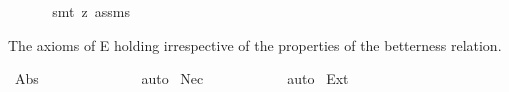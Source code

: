 \begin{isabellebody}
\ \ %
\isanewline
%
\isadelimproof
\ \ %
\endisadelimproof
%
\isatagproof
{}\isamarkupfalse%
\ {\isacharparenleft}{\kern0pt}smt\ {\isacharparenleft}{\kern0pt}z{}{\isacharparenright}{\kern0pt}\ assms{\isacharparenright}{\kern0pt}%
\endisatagproof
{\isafoldproof}%
%
\isadelimproof
%
\endisadelimproof
%
\begin{isamarkuptext}%
The axioms of E holding irrespective of the properties of the betterness relation.%
\end{isamarkuptext}\isamarkuptrue%
\isamarkupfalse%
\ Abs{\isacharprime}{\kern0pt}{\isacharcolon}{\kern0pt}\ {\isachardoublequoteopen}{\isasymlfloor}{\isasymcirc}{\isacharless}{\kern0pt}{\isasympsi}{\isacharbar}{\kern0pt}{\isasymphi}{\isachargreater}{\kern0pt}\ \isactrlbold {\isasymrightarrow}\ {\isasymbox}{\isasymcirc}{\isacharless}{\kern0pt}{\isasympsi}{\isacharbar}{\kern0pt}{\isasymphi}{\isachargreater}{\kern0pt}{\isasymrfloor}{\isachardoublequoteclose}\ \ \ \isanewline
\ \ %
\ \isanewline
%
\isadelimproof
\ \ %
\endisadelimproof
%
\isatagproof
{}\isamarkupfalse%
\ auto%
\endisatagproof
{\isafoldproof}%
%
\isadelimproof
\isanewline
%
\endisadelimproof
{}\isamarkupfalse%
\ Nec{\isacharprime}{\kern0pt}{\isacharcolon}{\kern0pt}\ {\isachardoublequoteopen}{\isasymlfloor}{\isasymbox}{\isasympsi}\ \isactrlbold {\isasymrightarrow}\ {\isasymcirc}{\isacharless}{\kern0pt}{\isasympsi}{\isacharbar}{\kern0pt}{\isasymphi}{\isachargreater}{\kern0pt}{\isasymrfloor}{\isachardoublequoteclose}\ \ \isanewline
\ \ %
\isanewline
%
\isadelimproof
\ \ %
\endisadelimproof
%
\isatagproof
{}\isamarkupfalse%
\ auto%
\endisatagproof
{\isafoldproof}%
%
\isadelimproof
\isanewline
%
\endisadelimproof
{}\isamarkupfalse%
\ Ext{\isacharprime}{\kern0pt}{\isacharcolon}{\kern0pt}\ {\isachardoublequoteopen}{\isasymlfloor}{\isasymbox}{\isacharparenleft}{\kern0pt}{\isasymphi}\isactrlbold {\isasymleftrightarrow}{\isasymphi}\ \isactrlbold {\isasymrightarrow}\ {\isacharparenleft}{\kern0pt}{\isasymcirc}{\isacharless}{\kern0pt}{\isasympsi}{\isacharbar}{\kern0pt}{\isasymphi}\ \isactrlbold {\isasymleftrightarrow}\ {\isasymcirc}{\isacharless}{\kern0pt}{\isasympsi}{\isacharbar}{\kern0pt}{\isasymphi}\ \ \isanewline

\end{isabellebody}
